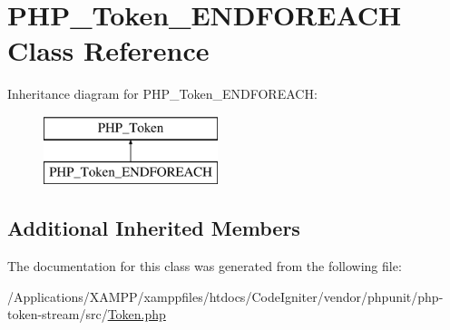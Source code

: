 \hypertarget{class_p_h_p___token___e_n_d_f_o_r_e_a_c_h}{}\section{P\+H\+P\+\_\+\+Token\+\_\+\+E\+N\+D\+F\+O\+R\+E\+A\+CH Class Reference}
\label{class_p_h_p___token___e_n_d_f_o_r_e_a_c_h}
Inheritance diagram for P\+H\+P\+\_\+\+Token\+\_\+\+E\+N\+D\+F\+O\+R\+E\+A\+CH\+:\begin{figure}[H]
\begin{center}
\leavevmode
\includegraphics[height=2.000000cm]{class_p_h_p___token___e_n_d_f_o_r_e_a_c_h}
\end{center}
\end{figure}
\subsection*{Additional Inherited Members}


The documentation for this class was generated from the following file\+:\begin{DoxyCompactItemize}
\item 
/\+Applications/\+X\+A\+M\+P\+P/xamppfiles/htdocs/\+Code\+Igniter/vendor/phpunit/php-\/token-\/stream/src/\mbox{\hyperlink{_token_8php}{Token.\+php}}\end{DoxyCompactItemize}

